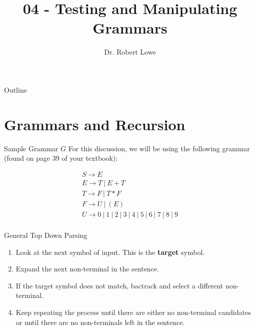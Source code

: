 \documentclass[]{beamer}
\title{04 - Testing and Manipulating Grammars}
\author{Dr. Robert Lowe\\}
\institute[Maryville College] %
{
  Division of Mathematics and Computer Science\\
  Maryville College
}
\date[]{}
\begin{document}
\begin{frame}
  \titlepage
\end{frame}

\begin{frame}{Outline}
  \tableofcontents
\end{frame}





\section{Grammars and Recursion}

\begin{frame}{Sample Grammar $G$}
    For this discussion, we will be using the following grammar (found on page 39 of your textbook):

    \[
      \begin{array}{l}
        S \rightarrow E\\
        E \rightarrow T\ |\ E + T\\
        T \rightarrow F\ |\ T * F\\
        F \rightarrow U\ |\ (E)\\
        U \rightarrow 0\ |\ 1\ |\ 2\ |\ 3\ |\ 4\ |\ 5\ |\ 6\ |\ 7\ |\ 8\ |\ 9\\
      \end{array}
    \]
\end{frame}

\begin{frame}{General Top Down Parsing}
  \begin{enumerate}[<+->]
    \item Look at the next symbol of input.  This is the \textbf{target} symbol.
    \item Expand the next non-terminal in the sentence.
    \item If the target symbol does not match, bactrack and select a different non-terminal.
    \item Keep repeating the process until there are either no non-terminal candidates or until there are no non-terminals left in the sentence.
  \end{enumerate}
\end{frame}
\end{document}
